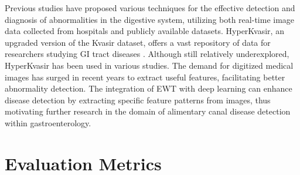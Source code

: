 \documentclass[UKenglish,12pt]{master-style}
\begin{document}
Previous studies have proposed various techniques for the effective detection and diagnosis of abnormalities in the digestive system, utilizing both real-time image data collected from hospitals and publicly available datasets.  HyperKvasir, an upgraded version of the Kvasir dataset, offers a vast repository of data for researchers studying GI tract diseases \cite{HyperKvasir_Dataset}. Although still relatively underexplored, HyperKvasir has been used in various studies. The demand for digitized medical images has surged in recent years to extract useful features, facilitating better abnormality detection. The integration of EWT with deep learning can enhance disease detection by extracting specific feature patterns from images, thus motivating further research in the domain of alimentary canal disease detection within gastroenterology.

\section{Evaluation Metrics}
\end{document}
